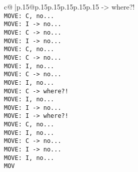 \documentclass{article}
\begin{document}
{\begin{supertabular}{c@{$\;$}|p{.15\linewidth}@{}p{.15\linewidth}p{.15\linewidth}p{.15\linewidth}p{.15\linewidth}p{.15\linewidth}}
{{{-> where?!\\ \tt  MOVE: C, no...\\ \tt  MOVE: I -> no...\\ \tt  MOVE: C -> no...\\ \tt  MOVE: I -> no...\\ \tt  MOVE: C, no...\\ \tt  MOVE: C -> no...\\ \tt  MOVE: I, no...\\ \tt  MOVE: C -> no...\\ \tt  MOVE: I, no...\\ \tt  MOVE: C -> where?!\\ \tt  MOVE: I, no...\\ \tt  MOVE: I -> no...\\ \tt  MOVE: I -> where?!\\ \tt  MOVE: C, no...\\ \tt  MOVE: I, no...\\ \tt  MOVE: C -> no...\\ \tt  MOVE: I -> no...\\ \tt  MOVE: I, no...\\ \tt  MOV}}}
\end{supertabular}}
\end{document}
